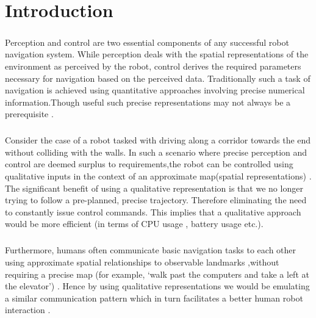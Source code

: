 
\chapter{Introduction}
\paragraph{}  Perception and control are two essential components of any successful robot navigation system. While perception deals with the spatial representations of the environment as perceived by the robot, control derives the required parameters necessary for navigation based on the perceived data. Traditionally such a task of navigation is achieved using quantitative approaches involving precise numerical information.Though useful such precise representations may not always be a prerequisite \cite{blackwell1988spatial} \cite{shah2013qualitative}.
\paragraph{} Consider the case of a robot tasked with driving along a corridor towards the end without colliding with the walls. In such a scenario where precise perception and control are deemed surplus to requirements,the robot  can be controlled using qualitative inputs in the context of an approximate map(spatial representations) \cite{shah2013qualitative}. The significant benefit of using a qualitative representation is that we no longer trying to follow a pre-planned, precise trajectory. Therefore eliminating the need to constantly issue control commands. This implies that a qualitative approach would be more efficient \cite{chen2015survey} (in terms of CPU usage \cite{wakita1995intelligent}, battery usage etc.).
\paragraph{} Furthermore, humans often communicate basic navigation tasks to each other using approximate spatial relationships to observable landmarks \cite{michon2001and} \cite{chen2015survey} ,without requiring a precise map (for example, ‘walk past the computers and take a left at the elevator’) \cite{shah2013qualitative}. Hence by using qualitative representations we would be emulating a similar communication pattern which in turn facilitates a better human robot interaction \cite{dondrup2015computational}. 

